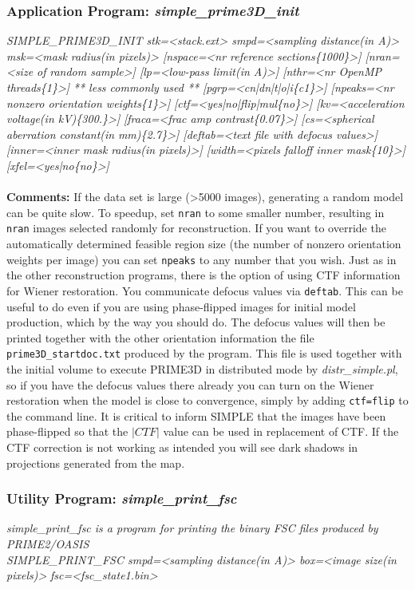 \documentclass[review]{elsarticle}
\begin{document}
{{\subsubsection{Application Program: {\it{simple\_prime3D\_init}}}
\label{prime3D_init}
{\it{SIMPLE\_PRIME3D\_INIT stk=<stack.ext> smpd=<sampling distance(in A)> msk=<mask}}
{\it{radius(in pixels)> [nspace=<nr reference sections\{1000\}>] [nran=<size of}}
{\it{random sample>] [lp=<low-pass limit(in A)>] [nthr=<nr OpenMP threads\{1\}>]}}
{\it{** less commonly used **}}
{\it{[pgrp=<cn|dn|t|o|i\{c1\}>] [npeaks=<nr nonzero orientation weights\{1\}>]}}
{\it{[ctf=<yes|no|flip|mul\{no\}>] [kv=<acceleration voltage(in kV)\{300.\}>]}}
{\it{[fraca=<frac amp contrast\{0.07\}>] [cs=<spherical aberration constant(in}}
{\it{mm)\{2.7\}>] [deftab=<text file with defocus values>] [inner=<inner mask}}
{\it{radius(in pixels)>] [width=<pixels falloff inner mask\{10\}>]}}
{\it{[xfel=<yes|no\{no\}>]}}
\\\\
\noindent\textbf{Comments:} If the data set is large (>5000 images), generating a random model can be quite slow. To speedup, set \texttt{nran} to some smaller number, resulting in \texttt{nran} images selected randomly for reconstruction. If you want to override the automatically determined feasible region size (the number of nonzero orientation weights per image) you can set \texttt{npeaks} to any number that you wish. Just as in the other reconstruction programs, there is the option of using CTF information for Wiener restoration. You communicate defocus values via \texttt{deftab}. This can be useful to do even if you are using phase-flipped images for initial model production, which by the way you should do. The defocus values will then be printed together with the other orientation information the file \texttt{prime3D\_startdoc.txt} produced by the program. This file is used together with the initial volume to execute PRIME3D in distributed mode by {\it{distr\_simple.pl}}, so if you have the defocus values there already you can turn on the Wiener restoration when the model is close to convergence, simply by adding \texttt{ctf=flip} to the command line. It is critical to inform SIMPLE that the images have been phase-flipped so that the $|CTF|$ value can be used in replacement of CTF. If the CTF correction is not working as intended you will see dark shadows in projections generated from the map.

\subsubsection{Utility Program: {\it{simple\_print\_fsc}}}
\label{print_fsc}
{\it{simple\_print\_fsc} is a program for printing the binary FSC files produced by PRIME2/OASIS}\\
{\it{SIMPLE\_PRINT\_FSC smpd=<sampling distance(in A)> box=<image size(in pixels)>}}
{\it{fsc=<fsc\_state1.bin>}}

}}
\end{document}
